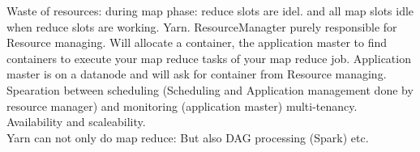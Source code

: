 Waste of resources: during map phase: reduce slots are idel. and all map slots idle when reduce slots are working.
\textrightarrow Yarn.
ResourceManagter purely responsible for Resource managing. Will allocate a container, the application master
to find containers to execute your map reduce tasks of your map reduce job.
Application master is on a datanode and will ask for container
from Resource managing. \\
Spearation between scheduling (Scheduling and Application management done by resource manager) and monitoring (application master)
\textrightarrow multi-tenancy. Availability and scaleability. \\
Yarn can not only do map reduce: But also DAG processing (Spark) etc.










